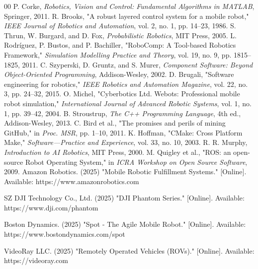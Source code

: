 \documentclass[conference]{IEEEtran}
\begin{document}
\begin{thebibliography}{00} 
 P. Corke, \textit{Robotics, Vision and Control: Fundamental Algorithms in MATLAB}, Springer, 2011.
 R. Brooks, "A robust layered control system for a mobile robot," \textit{IEEE Journal of Robotics and Automation}, vol. 2, no. 1, pp. 14–23, 1986.
 S. Thrun, W. Burgard, and D. Fox, \textit{Probabilistic Robotics}, MIT Press, 2005.
 L. Rodríguez, P. Bustos, and P. Bachiller, "RoboComp: A Tool-based Robotics Framework," \textit{Simulation Modelling Practice and Theory}, vol. 19, no. 9, pp. 1815–1825, 2011.
 C. Szyperski, D. Gruntz, and S. Murer, \textit{Component Software: Beyond Object-Oriented Programming}, Addison-Wesley, 2002.
 D. Brugali, "Software engineering for robotics," \textit{IEEE Robotics and Automation Magazine}, vol. 22, no. 3, pp. 24–32, 2015.
 O. Michel, "Cyberbotics Ltd. Webots: Professional mobile robot simulation," \textit{International Journal of Advanced Robotic Systems}, vol. 1, no. 1, pp. 39–42, 2004.
 B. Stroustrup, \textit{The C++ Programming Language}, 4th ed., Addison-Wesley, 2013.
 C. Bird et al., "The promises and perils of mining GitHub," in \textit{Proc. MSR}, pp. 1–10, 2011.
 K. Hoffman, "CMake: Cross Platform Make," \textit{Software—Practice and Experience}, vol. 33, no. 10, 2003.
 R. R. Murphy, \textit{Introduction to AI Robotics}, MIT Press, 2000.
 M. Quigley et al., "ROS: an open-source Robot Operating System," in \textit{ICRA Workshop on Open Source Software}, 2009.
Amazon Robotics. (2025) "Mobile Robotic Fulfillment Systems." [Online]. Available: https://www.amazonrobotics.com

SZ DJI Technology Co., Ltd. (2025) "DJI Phantom Series." [Online]. Available: https://www.dji.com/phantom

Boston Dynamics. (2025) "Spot - The Agile Mobile Robot." [Online]. Available: https://www.bostondynamics.com/spot

VideoRay LLC. (2025) "Remotely Operated Vehicles (ROVs)." [Online]. Available: https://videoray.com



\end{thebibliography}
\end{document}
